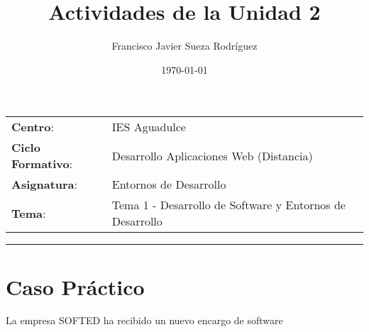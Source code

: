 


\title{
    \vspace{10ex}
    \normalfont \normalsize
    \huge \textbf{Actividades de la Unidad 2}
}
\author{Francisco Javier Sueza Rodríguez}
\date{\normalsize\today}



\maketitle

\thispagestyle{empty}

\vspace{75ex}

\begin{center}
    \begin{tabular}{l l}
        \textbf{Centro}: & IES Aguadulce \\
        \textbf{Ciclo Formativo}: & Desarrollo Aplicaciones Web (Distancia)\\
        \textbf{Asignatura}: & Entornos de Desarrollo\\
       \textbf{Tema}: & Tema 1 - Desarrollo de Software y Entornos de Desarrollo\\
    \end{tabular}
\end{center}

\newpage

\tableofcontents

\vspace{15ex}

\hrule

\vspace{10ex}

\listoffigures

\newpage

\section{Caso Práctico}
La empresa SOFTED ha recibido un nuevo encargo de software

